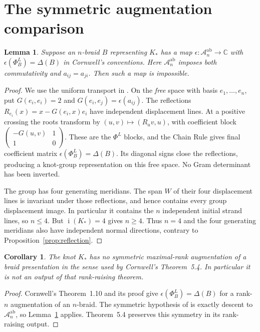 \documentclass[11pt]{article}
\newtheorem{lemma}[theorem]{Lemma}
\newtheorem{corollary}[theorem]{Corollary}
\newcommand{\bi}{\operatorname{i}}
\begin{document}
\section{The symmetric augmentation comparison}

\begin{lemma}\label{lem:free}
Suppose an $n$-braid $B$ representing $K_*$ has a map
$\epsilon:\mathcal A_n^{\mathrm{ab}}\to\mathbb C$ with
$\epsilon(\Phi_B^L)=\Delta(B)$ in Cornwell's conventions.
Here $\mathcal A_n^{\mathrm{ab}}$ imposes both commutativity
and $a_{ij}=a_{ji}$. Then such a map is impossible.
\end{lemma}
\begin{proof}
We use the uniform transport in
\cite[Lemma \texttt{lem:transport}]{symmetric}.
On the \emph{free} space with basis $e_1,\ldots,e_n$, put
$G(e_i,e_i)=2$ and $G(e_i,e_j)=\epsilon(a_{ij})$.
The reflections
$R_{e_i}(x)=x-G(e_i,x)e_i$ have independent displacement lines.
At a positive crossing the roots transform by
$(u,v)\mapsto(R_uv,u)$, with coefficient block
$\left(\begin{smallmatrix}-G(u,v)&1\\1&0\end{smallmatrix}\right)$.
These are the $\Phi^L$ blocks, and the Chain Rule gives final
coefficient matrix $\epsilon(\Phi_B^L)=\Delta(B)$.
Its diagonal signs close the reflections, producing a
knot-group representation on this free space.
No Gram determinant has been inverted.

The group has four generating meridians.
The span $W$ of their four displacement lines is invariant under
those reflections, and hence contains every group displacement
image. In particular it contains the $n$ independent initial
strand lines, so $n\le4$. But $\bi(K_*)=4$ gives $n\ge4$.
Thus $n=4$ and the four generating meridians also have independent
normal directions, contrary to Proposition~\ref{prop:reflection}.
\end{proof}

\begin{corollary}\label{cor:symmetric}
The knot $K_*$ has no symmetric maximal-rank augmentation of
a braid presentation in the sense used by Cornwell's
Theorem~5.4. In particular it is not an output of that
rank-raising theorem.
\end{corollary}
\begin{proof}
Cornwell's Theorem~1.10 and its proof give
$\epsilon(\Phi_B^L)=\Delta(B)$ for a rank-$n$ augmentation
of an $n$-braid. The symmetric hypothesis of
\cite[Theorem~5.4, p.~20]{cornwell} is exactly descent to
$\mathcal A_n^{\mathrm{ab}}$, so Lemma~\ref{lem:free} applies.
Theorem~5.4 preserves this symmetry in its rank-raising output.
\end{proof}
\end{document}
